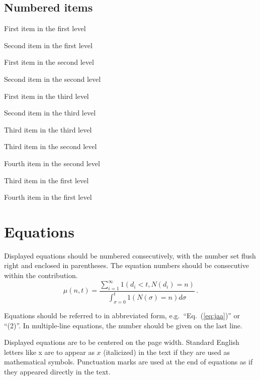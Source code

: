 \documentclass{ws-ijsc}
\begin{document}
\subsection*{Numbered items}

\begin{arabiclist}
\item First item in the first level
\item Second item in the first level
\begin{alphlist}[(a)]
\item First item in the second level 
\item Second item in the second level
\begin{romanlist}[iii.]
\item First item in the third level 
\item Second item in the third level
\item Third item in the third level
\end{romanlist}
\item Third item in the second level
\item Fourth item in the second level
\end{alphlist}
\item Third item in the first level
\item Fourth item in the first level
\end{arabiclist}

\section{Equations}

Displayed equations should be numbered consecutively,
with the number set flush right and enclosed in parentheses. The
equation numbers should be consecutive within the contribution.
\begin{equation}
\mu(n, t) = \frac{\sum^\infty_{i=1} 1(d_i < t, N(d_i) = n)}{
\int^t_{\sigma=0} 1(N(\sigma) = n)d\sigma}\, .
\label{eq:jaa}
\end{equation}

Equations should be referred to in abbreviated form,
e.g.~``Eq.~(\ref{eq:jaa})'' or ``(2)''. In multiple-line
equations, the number should be given on the last line.

Displayed equations are to be centered on the page width.
Standard English letters like x are to appear as $x$
(italicized) in the text if they are used as mathematical
symbols. Punctuation marks are used at the end of equations as
if they appeared directly in the text.
\end{document}
